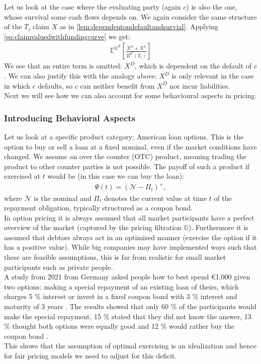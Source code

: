 \documentclass[12pt]{article}
\begin{document}
	Let us look at the case where the evaluating party (again $c$) is also the one, whose survival some cash flows depends on. We again consider the same structure of the $T_i$ claim $X$ as in \cref{lem:dependentondefaultandsurvial}. Applying \cref{eq:claimvaluedwithfundingcurve} we get:
	\begin{align*}
		\mathbb{E}^{\mathbb{Q}^B}\left[ \frac{X^O + X^S}{B^{d^c}(T_i)} \right]
	\end{align*}
	We see that an entire term is omitted: $X^D$, which is dependent on the default of $c$. We can also justify this with the analogy above: $X^D$ is only relevant in the case in which $c$ defaults, so $c$ can neither benefit from $X^D$ nor incur liabilities.\\
	Next we will see how we can also account for some behavioural aspects in pricing.
	
	\subsubsection{Introducing Behavioral Aspects}
	Let us look at a specific product category: American loan options. This is the option to buy or sell a loan at a fixed nominal, even if the market conditions have changed. We assume an over the counter (OTC) product, meaning trading the product to other counter parties is not possible. The payoff of such a product if exercised at $t$ would be (in this case we can buy the loan):
	\begin{align*}
		\Psi(t) = \left(\mathcal{N} - \Pi_t\right)^+,
	\end{align*}
	where $\mathcal{N}$ is the nominal and $\Pi_t$ denotes the current value at time $t$ of the repayment obligation, typically structured as a coupon bond.\\
	In option pricing it is always assumed that all market participants have a perfect overview of the market (captured by the pricing filtration $\mathbb{G}$). Furthermore it is assumed that debtors always act in an optimized manner (exercise the option if it has a positive value). While big companies may have implemented ways such that these are feasible assumptions, this is far from realistic for small market participants such as private people.\\
	A study from 2021 from Germany asked people how to best spend €1,000 given two options: making a special repayment of an existing loan of theirs, which charges 5 \% interest or invest in a fixed coupon bond with 3 \% interest and maturity of 3 years \cite{finKnowledgeStudy}.
	The results showed that only 60 \% of the participants would make the special repayment. 15 \% stated that they did not know the answer, 13 \% thought both options were equally good and 12 \% would rather buy the coupon bond \cite{finKnowledgeStudy}.\\
	This shows that the assumption of optimal exercising is an idealization and hence for fair pricing models we need to adjust for this deficit.
	
\end{document}
